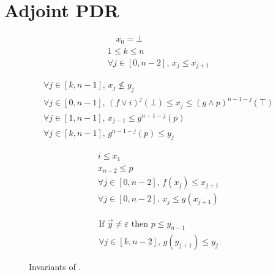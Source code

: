 \section{Adjoint PDR}\label{sec:pdr:APDR}

\begin{figure}[t]
	\begin{minipage}{.35\linewidth}
		\small
		\begin{align}
			\quad x_0 = \bot \tag{I0}\label{eq:pdr:x0bot} \\
			1\leq k \leq n \tag{I1} \label{eq:pdr:invi}   \\
			\forall j\in[0, n-2]\text{, }x_j \le x_{j+1} \tag{I2}\label{eq:pdr:positivechain}
		\end{align}
	\end{minipage}%
	\begin{minipage}{.65\linewidth}
		\small
		\begin{align}
			\forall j \in [k, n - 1] \text{, } x_j \not\le y_j \tag{PN} \label{eq:pdr:positivenegative}                                              \\
			\forall j \in [0, n-1] \text{, } (f \lor i)^j (\bot) \le x_j \le (g \land p)^{n-1-j} (\top) \tag{A1} \label{eq:pdr:positiveinitialfinal} \\
			\forall j \in [1, n-1] \text{, } x_{j-1} \le g^{n-1-j}(p) \tag{A2} \label{eq:pdr:positivefinal}                                          \\
			\forall j\in[k,n-1]\text{, }g^{n-1-j}(p) \le y_j \tag{A3} \label{eq:pdr:negativefinal}
		\end{align}
	\end{minipage}
	\begin{minipage}{.4\linewidth}
		\small
		\begin{align}
			i \le x_1 \tag{P1} \label{eq:pdr:Ix1}                                            \\
			x_{n-2} \le p \tag{P2}\label{eq:pdr:xP}                                          \\
			\forall j\in[0, n-2]\text{, }f(x_j) \le x_{j+1} \tag{P3}\label{eq:pdr:positiveF} \\
			\forall j\in[0, n-2]\text{, }x_j \le g(x_{j+1}) \tag{P3a} \label{eq:pdr:positiveG}
		\end{align}
	\end{minipage}%
	\begin{minipage}{.6\linewidth}
		\small
		\begin{align}
			\text{If }\vec{y}\neq \varepsilon\text{ then }p \le y_{n-1} \tag{N1}\label{eq:pdr:Pepsilon} \\
			\forall j\in[k,n-2]\text{, }g(y_{j+1}) \le y_j \tag{N2}\label{eq:pdr:negativeG}
		\end{align}
	\end{minipage}

	\vspace*{0.5em}
	\caption{Invariants of {\APDR}.}
	\label{fig:pdr:invariants}
\end{figure}

